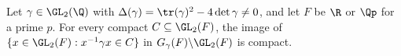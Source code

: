 Let $\gamma\in\GL_2(\Q)$ with $\Delta(\gamma)=\tr(\gamma)^2-4\det\gamma\neq0$, and let $F$ be $\R$ or $\Qp$ for a prime $p$. For every compact
$C\subseteq\GL_2(F)$, the image of $\{x\in\GL_2(F):x^{-1}\gamma x\in C\}$ in $G_\gamma(F)\backslash\GL_2(F)$ is compact.
